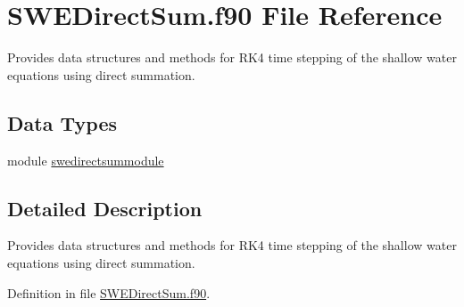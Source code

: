 \hypertarget{_s_w_e_direct_sum_8f90}{\section{S\+W\+E\+Direct\+Sum.\+f90 File Reference}
\label{_s_w_e_direct_sum_8f90}
}


Provides data structures and methods for R\+K4 time stepping of the shallow water equations using direct summation.  


\subsection*{Data Types}
\begin{DoxyCompactItemize}
\item 
module \hyperlink{classswedirectsummodule}{swedirectsummodule}
\end{DoxyCompactItemize}


\subsection{Detailed Description}
Provides data structures and methods for R\+K4 time stepping of the shallow water equations using direct summation. 



Definition in file \hyperlink{_s_w_e_direct_sum_8f90_source}{S\+W\+E\+Direct\+Sum.\+f90}.

